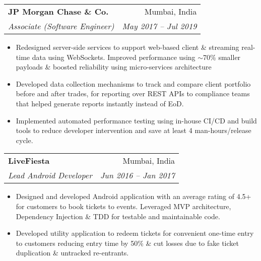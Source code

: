 \documentclass[letterpaper,11pt]{article}
\makeatletter
\newcommand{\resumeItem}[2]{
	\item\normalsize{
		\textbf{#1}{: #2}
	}\vspace{-2pt}
}
\newcommand{\resumeSubheading}[4]{
	\vspace{-2pt}\item
	\begin{tabular*}{0.97\textwidth}[t]{l@{\extracolsep{\fill}}r}
		\textbf{#1} & #2 \\
		\textit{\small#3} & \textit{\small #4} \\
	\end{tabular*}\vspace{-8pt}
}
\newcommand{\resumeSubHeadingListStart}{\begin{itemize}[leftmargin=*]}
\newcommand{\resumeSubHeadingListEnd}{\end{itemize}}
\makeatother
\begin{document}
	\resumeSubheading
	{JP Morgan Chase \& Co.}{Mumbai, India}
	{Associate (Software Engineer)}{May 2017 -- Jul 2019}
	\resumeSubHeadingListStart
	\item{Redesigned server-side services to support web-based client \& streaming real-time data using WebSockets. Improved performance using $\sim$70\% smaller payloads \& boosted reliability using micro-services architecture}
	\item{Developed data collection mechanisms to track and compare client portfolio before and after trades, for reporting over REST APIs to compliance teams that helped generate reports instantly instead of EoD.}
	\item{Implemented automated performance testing using in-house CI/CD and build tools to reduce developer intervention and save at least 4 man-hours/release cycle.}
	\vspace{-2mm}
	\resumeSubHeadingListEnd
	
	\resumeSubheading
	{LiveFiesta}{Mumbai, India}
	{Lead Android Developer}{Jun 2016 -- Jan 2017}
	\resumeSubHeadingListStart
	\item
	{Designed and developed Android application with an average rating of 4.5+ for customers to book tickets to events. Leveraged MVP architecture, Dependency Injection \& TDD for testable and maintainable code.} %
	\item
	{Developed utility application to redeem tickets for convenient one-time entry to customers reducing entry time by 50\% \& cut losses due to fake ticket duplication \& untracked re-entrants.} %
	\vspace{-2mm}
	\resumeSubHeadingListEnd
	
\end{document}
